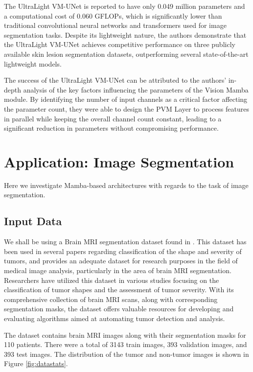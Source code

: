 \documentclass[conference]{IEEEtran}
\begin{document}
The UltraLight VM-UNet is reported to have only 0.049 million parameters and a computational cost of 0.060 GFLOPs, which is significantly lower than traditional convolutional neural networks and transformers used for image segmentation tasks. Despite its lightweight nature, the authors demonstrate that the UltraLight VM-UNet achieves competitive performance on three publicly available skin lesion segmentation datasets, outperforming several state-of-the-art lightweight models.

The success of the UltraLight VM-UNet can be attributed to the authors' in-depth analysis of the key factors influencing the parameters of the Vision Mamba module. By identifying the number of input channels as a critical factor affecting the parameter count, they were able to design the PVM Layer to process features in parallel while keeping the overall channel count constant, leading to a significant reduction in parameters without compromising performance.



\section{Application: Image Segmentation}
Here we investigate Mamba-based architectures with regards to the task of image segmentation.

\subsection{Input Data}\label{sec2}
We shall be using a Brain MRI segmentation dataset found in \cite{dataset}. This dataset has been used in several papers regarding classification of the shape and severity of tumors, and provides an adequate dataset for research purposes in the field of medical image analysis, particularly in the area of brain MRI segmentation. Researchers have utilized this dataset in various studies focusing on the classification of tumor shapes and the assessment of tumor severity. With its comprehensive collection of brain MRI scans, along with corresponding segmentation masks, the dataset offers valuable resources for developing and evaluating algorithms aimed at automating tumor detection and analysis.

The dataset contains brain MRI images along with their segmentation masks for 110 patients. There were a total of 3143 train images, 393 validation images, and 393 test images. The distribution of the tumor and non-tumor images is shown in Figure \ref{fig:datastats}.
\end{document}
